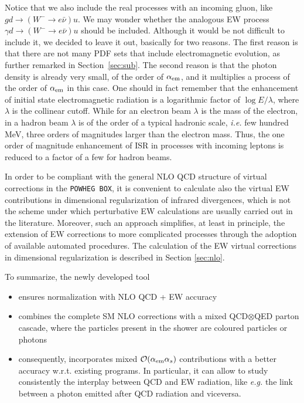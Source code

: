 \documentclass[11pt,a4paper]{article}
\newcommand\POWHEGBOX{\texttt{POWHEG BOX}}
\newcommand\aem{\alpha_{\rm em}}
\begin{document}
Notice that we also include the real processes with an incoming
gluon, like $g d\to(W^-\to e\bar\nu)u$. We may wonder whether the
analogous EW process $\gamma d\to(W^-\to e\bar\nu)u$ should be included.
Although it would be not difficult to include it, we decided to leave
it out, basically for two reasons. The first reason is that there are not many
PDF sets that include electromagnetic evolution, as further remarked in 
Section~\ref{sec:sub}. The second reason is that
the photon density is already very small, of the order of $\aem$, and it
multiplies a process of the order of $\aem$ in this case. One should in fact
remember that the enhancement of initial state electromagnetic radiation
is a logarithmic factor of $\log E/\lambda$, where $\lambda$ is the
collinear cutoff. While for an electron beam $\lambda$ is the mass
of the electron, in a hadron beam $\lambda$ is of the order of a typical
hadronic scale, {\it i.e.} few hundred MeV, three orders of magnitudes larger
than the electron mass. Thus, the one order of magnitude enhancement
of ISR in processes with incoming leptons is reduced to a factor of a few
for hadron beams.


In order to be compliant with the general NLO QCD structure of virtual
corrections in the \POWHEGBOX{}, it is convenient to calculate
also the virtual EW contributions in dimensional regularization of
infrared divergences, which is not the scheme under which perturbative
EW calculations are usually carried out in the literature. Moreover, such an
approach simplifies, at least in principle, the extension of EW
corrections to more complicated processes through the adoption of
available automated procedures. The calculation of the EW virtual
corrections in dimensional regularization is described in Section
\ref{sec:nlo}.


To summarize, the newly developed tool
\begin{itemize}

\item ensures normalization with NLO QCD + EW accuracy

\item combines the complete SM NLO corrections with a mixed
  QCD$\otimes$QED parton cascade, where the particles present in the
  shower are coloured particles or photons

\item consequently, incorporates mixed ${\cal O}(\aem \alpha_s)$ contributions
  with a better accuracy w.r.t. existing programs. In particular, it
  can allow to study consistently the interplay between QCD and EW
  radiation, like {\it e.g.} the link between a photon emitted after QCD
  radiation and viceversa.

\end{itemize}
\end{document}
